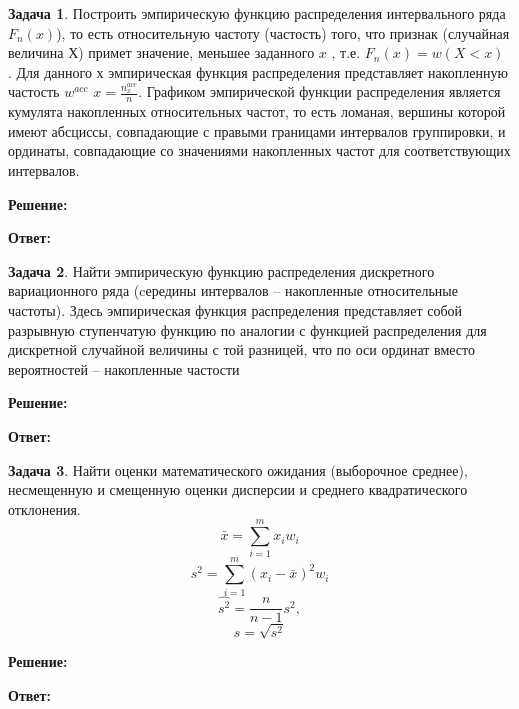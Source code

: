 \documentclass[a4paper,12pt]{article}
\theoremstyle{definition}
\newtheorem{problem}{Задача}
\newenvironment{solution}
{\begin{shaded}\textbf{Решение:}\par}
{\end{shaded}}
\newenvironment{answer}
{\par\noindent\textbf{Ответ:} \color{blue}}
{\par}
\begin{document}
\vspace{8pt}
\begin{problem}
    Построить эмпирическую функцию распределения интервального ряда \(F_n(x)\)), то
    есть относительную частоту (частость) того, что признак (случайная величина \(Х\)) 
    примет значение, меньшее заданного \(x\) , т.е. \(F_n(x) = w(X < x)\) . Для данного \(х\)
    эмпирическая функция распределения представляет накопленную частость \(w^{acc}\) 
    \(x = \frac{n^{acc}_x}{n}\).
    Графиком эмпирической функции распределения является кумулята накопленных
    относительных частот, то есть ломаная, вершины которой имеют абсциссы,
    совпадающие с правыми границами интервалов группировки, и ординаты,
    совпадающие со значениями накопленных частот для соответствующих
    интервалов.
    
        \begin{solution}
        \end{solution}
    
        \begin{answer}
        \end{answer}
    
    \end{problem}





\vspace{8pt}
\begin{problem}
    Найти эмпирическую функцию распределения дискретного вариационного ряда
    (cередины интервалов – накопленные относительные частоты).
    Здесь эмпирическая функция распределения представляет собой разрывную
    ступенчатую функцию по аналогии с функцией распределения для дискретной
    случайной величины с той разницей, что по оси ординат вместо вероятностей –
    накопленные частости
    
        \begin{solution}
        \end{solution}
    
        \begin{answer}
        \end{answer}
    
    \end{problem}



\vspace{8pt}
\begin{problem}
    Найти оценки математического ожидания (выборочное среднее), несмещенную и
    смещенную оценки дисперсии и среднего квадратического отклонения.
    \[\bar{x} = \sum^m_{i=1} x_i w_i\]
    \[s^2 = \sum^m_{i=1}(x_i - \bar{x})^2 w_i\]
    \[\hat{s^2} = \frac{n}{n-1} s^2, \]
    \[s = \sqrt{s^2}\]
    
        \begin{solution}
        \end{solution}
    
        \begin{answer}
        \end{answer}
    
    \end{problem}
\end{document}
